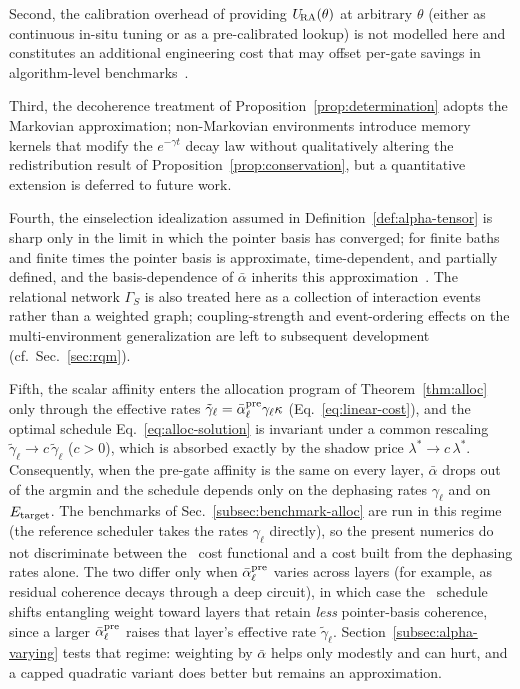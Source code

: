 Second, the calibration overhead of providing $U_{\!\mathrm{RA}}(\theta)$ at
arbitrary $\theta$ (either as continuous in-situ tuning or as a pre-calibrated lookup) is not modelled here and constitutes an
additional engineering cost that may offset per-gate savings in
algorithm-level benchmarks~\cite{Foxen2020,Lacroix2020}.

Third, the decoherence treatment of Proposition~\ref{prop:determination}
adopts the Markovian approximation; non-Markovian environments introduce
memory kernels that modify the $e^{-\gamma t}$ decay law without
qualitatively altering the redistribution result of
Proposition~\ref{prop:conservation}, but a quantitative extension is
deferred to future work.

Fourth, the einselection idealization assumed in
Definition~\ref{def:alpha-tensor} is sharp only in the limit in which
the pointer basis has converged; for finite baths and finite times the
pointer basis is approximate, time-dependent, and partially defined,
and the basis-dependence of $\bar\alpha$ inherits this
approximation~\cite{Schlosshauer2005}.
The relational network $\Gamma_S$ is also treated here as a collection
of interaction events rather than a weighted graph; coupling-strength
and event-ordering effects on the multi-environment generalization are
left to subsequent development (cf.\ Sec.~\ref{sec:rqm}).

Fifth, the scalar affinity enters the allocation program of
Theorem~\ref{thm:alloc} only through the effective rates
$\tilde\gamma_\ell = \bar\alpha_\ell^{\rm pre}\gamma_\ell\kappa$
(Eq.~\eqref{eq:linear-cost}), and the optimal schedule
Eq.~\eqref{eq:alloc-solution} is invariant under a common rescaling
$\tilde\gamma_\ell \to c\,\tilde\gamma_\ell$ ($c>0$), which is absorbed
exactly by the shadow price $\lambda^{\!*} \to c\,\lambda^{\!*}$.
Consequently, when the pre-gate affinity is the same on every layer,
$\bar\alpha$ drops out of the argmin and the schedule depends only on
the dephasing rates $\gamma_\ell$ and on $E_{\rm target}$.
The benchmarks of Sec.~\ref{subsec:benchmark-alloc} are run in this
regime (the reference scheduler takes the rates $\gamma_\ell$ directly),
so the present numerics do not discriminate between the \RCF~cost
functional and a cost built from the dephasing rates alone.
The two differ only when $\bar\alpha_\ell^{\rm pre}$ varies across layers (for example, as residual coherence decays through a deep circuit), in which case the \RCF~schedule shifts entangling weight
toward layers that retain \emph{less} pointer-basis coherence, since a
larger $\bar\alpha_\ell^{\rm pre}$ raises that layer's effective rate
$\tilde\gamma_\ell$.
Section~\ref{subsec:alpha-varying} tests that regime: weighting by
$\bar\alpha$ helps only modestly and can hurt, and a capped quadratic
variant does better but remains an approximation.

